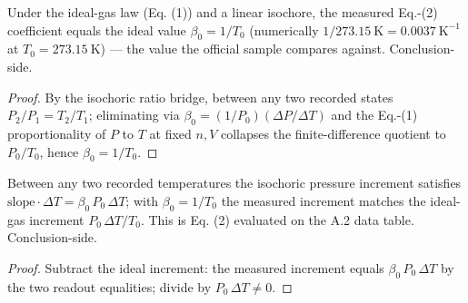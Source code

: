 \begin{theorem}[A.5 ideal value: $\beta_0 = 1/T_0$]
\label{thm:IPhO2026Problems_problem_IPhO_2026_4_A_5:beta0_close_to_ideal}
Under the ideal-gas law (Eq. (1)) and a linear isochore, the measured
Eq.-(2) coefficient equals the ideal value $\beta_0 = 1/T_0$
(numerically $1/273.15\ \mathrm{K} = 0.0037\ \mathrm{K^{-1}}$ at
$T_0 = 273.15\ \mathrm{K}$) --- the value the official sample compares
against.  Conclusion-side.
\end{theorem}
\begin{proof}
By the isochoric ratio bridge, between any two recorded states
$P_2/P_1 = T_2/T_1$; eliminating via
$\beta_0 = (1/P_0)(\Delta P/\Delta T)$ and the Eq.-(1) proportionality of
$P$ to $T$ at fixed $n, V$ collapses the finite-difference quotient to
$P_0/T_0$, hence $\beta_0 = 1/T_0$.
\end{proof}

\begin{theorem}
\label{thm:IPhO2026Problems_problem_IPhO_2026_4_A_5:beta0_eq_ideal_of_linear}
Between any two recorded temperatures the isochoric pressure increment
satisfies $\mathrm{slope}\cdot\Delta T = \beta_0\,P_0\,\Delta T$; with
$\beta_0 = 1/T_0$ the measured increment matches the ideal-gas increment
$P_0\,\Delta T/T_0$.  This is Eq. (2) evaluated on the A.2 data table.
Conclusion-side.
\end{theorem}
\begin{proof}
Subtract the ideal increment: the measured increment equals
$\beta_0\,P_0\,\Delta T$ by the two readout equalities; divide by
$P_0\,\Delta T \neq 0$.
\end{proof}


